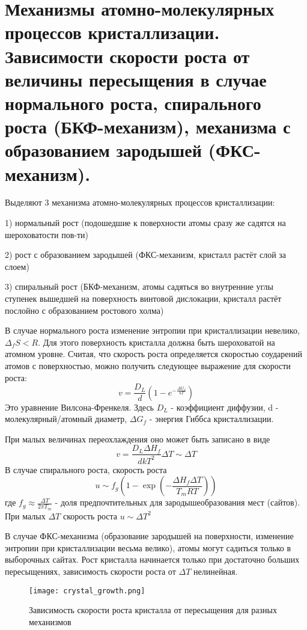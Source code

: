 \section{Механизмы атомно-молекулярных процессов кристаллизации. Зависимости
скорости роста от величины пересыщения в случае нормального роста, спирального
роста (БКФ-механизм), механизма с образованием зародышей (ФКС-механизм).}
Выделяют 3 механизма атомно-молекулярных процессов кристаллизации:\par
1) нормальный рост (подошедшие к поверхности атомы сразу же садятся на шероховатости пов-ти)
\par 2) рост с образованием зародышей (ФКС-механизм, кристалл растёт слой за слоем)
\par3) спиральный рост (БКФ-механизм, атомы садяться во внутренние углы ступенек вышедшей на поверхность винтовой дислокации, кристалл растёт послойно с образованием ростового холма)
\par В случае нормального роста изменение энтропии при кристаллизации невелико, $\Delta_f S < R$. Для этого поверхность кристалла должна быть шероховатой на атомном уровне. Считая, что скорость роста определяется скоростью соударений атомов с поверхностью, можно получить следующее выражение для скорости роста:
\begin{equation}
v = \frac{D_L}{d}(1-e^{-\frac{\Delta G_f}{kT}})
\label{eq:Normal_growth}  
\end{equation}
Это уравнение Вилсона-Френкеля. Здесь $D_L$ - коэффициент диффузии, d - молекулярный/атомный диаметр, $\Delta G_f$ - энергия Гиббса кристаллизации. \par
При малых величинах переохлаждения оно может быть записано в виде 
\begin{equation}
v = \frac{D_L \Delta H_f}{dkT^2}\Delta T \sim \Delta T
\label{eq:Normal_growth_approximation}  
\end{equation}
В случае спирального роста, скорость роста 
\begin{equation}
u \sim f_g \left(1 - \exp \left(-\frac{\Delta H_f \Delta T}{T_m R T} \right) \right)
\label{eq:Spiral_growth}  
\end{equation}
где $f_g \approx \frac{\Delta T}{2 \pi T_m}$ - доля предпочтительных для зародышеобразования мест (сайтов). При малых $\Delta T$ скорость роста $u\sim\Delta T^2$\par
В случае ФКС-механизма (образование зародышей на поверхности, изменение энтропии при кристаллизации весьма велико), атомы могут садиться только в выборочных сайтах. Рост кристалла начинается только при достаточно больших пересыщениях, зависимость скорости роста от $\Delta T$ нелинейная.
\begin{figure}[h!]
\centering
\texttt{[image: crystal\_growth.png]}\label{fig:crystal_growth}\caption{Зависимость скорости роста кристалла от пересыщения для разных механизмов}
\end{figure}
